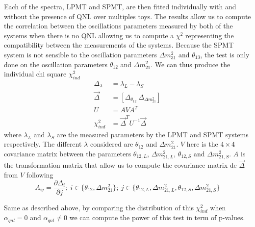 \documentclass[../main.tex]{subfiles}
\begin{document}
Each of the spectra, LPMT and SPMT, are then fitted individually with and without the presence of QNL over multiples toys. The results allow us to compute the correlation between the oscillations parameters measured by both of the systems when there is no QNL allowing us to compute a $\chi^2$ representing the compatibility between the measurements of the systems. Because the SPMT system is not sensible to the oscillation parameters $\Delta m^2_{31}$ and $\theta_{13}$, the test is only done on the oscillation parameters $\theta_{12}$ and $\Delta m^2_{21}$. We can thus produce the individual chi square $\chi^2_{ind}$
\begin{align}
  \Delta_\lambda &= \lambda_{L} - \lambda_{S} \\
  \vec{\Delta} &= [ \Delta_{\theta_{12}} ~ \Delta_{\Delta m^2_{21}} ] \\
  U &= A V A^T \\
  \chi^2_{ind} &= \vec{\Delta}^T U^{-1} \vec{\Delta}
\end{align}
where $\lambda_{L}$ and $\lambda_{S}$ are the measured parameters by the LPMT and SPMT systems respectively. The different $\lambda$ considered are $\theta_{12}$ and $\Delta m^2_{21}$. $V$ here is the $4\times 4$ covariance matrix between the parameters $\theta_{12, L}$, $\Delta m^2_{21, L}$, $\theta_{12, S}$ and  $\Delta m^2_{21, S}$. $A$ is the transformation matrix that allow us to compute the covariance matrix de $\vec{\Delta}$ from $V$ following
\begin{equation}
  A_{ij} = \frac{\partial \Delta_i}{\partial j}; ~ i \in \{ \theta_{12}, \Delta m^2_{21} \}; ~ j \in \{ \theta_{12, L}, \Delta m^2_{21, L}, \theta_{12, S}, \Delta m^2_{21, S} \}
\end{equation}

Same as described above, by comparing the distribution of this $\chi^2_{ind}$ when $\alpha_{qnl} = 0$ and $\alpha_{qnl} \neq 0$ we can compute the power of this test in term of p-values.

%
%
%
%
%
%
%
%
%
\end{document}

